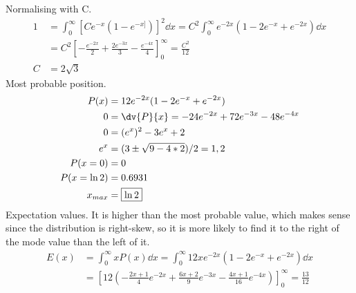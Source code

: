\documentclass[newpage]{homework}
\begin{document}
\question
Normalising with C.
\begin{align*}
    1	&=	\int_0^\infty [Ce^{-x} (1-e^{-x]})]^2 \dd{x}
    = C^2 \int_0^\infty e^{-2x} (1 - 2e^{-x} + e^{-2x}) \dd{x}  \\
    &=  C^2 [-\frac{e^{-2x}}{2} + \frac{2e^{-3x}}{3} - \frac{e^{-4x}}{4}]_0^\infty
    = \frac{C^2}{12}    \\
    C &= \boxed{2\sqrt{3}}
\end{align*}
Most probable position.
\begin{align*}
    P(x)    &=  12 e^{-2x} (1 - 2e^{-x} + e^{-2x})	\\
    0   &=   \dv{P}{x}   = -24e^{-2x} + 72e^{-3x} - 48e^{-4x}   \\
    0   &=  (e^x)^2 - 3e^x + 2  \\
    e^x &=  (3 \pm \sqrt{9 - 4*2})/2 = 1,2  \\
    P(x=0)  &=  0   \\
    P(x=\ln{2}) &= 0.6931   \\
    x_{max} &=  \boxed{\ln{2}}
\end{align*}
Expectation values. It is higher than the most probable value, which makes sense since the distribution is right-skew, so it is more likely to find it to the right of the mode value than the left of it.
\begin{align*}
    E(x)	&=	\int_0^\infty xP(x) \dd{x}
    = \int_0^\infty 12x e^{-2x} (1 - 2e^{-x} + e^{-2x}) \dd{x} \\
    &= \left[ 12 \left( -\frac{2x+1}{4} e^{-2x}   + \frac{6x+2}{9} e^{-3x} - \frac{4x+1}{16} e^{-4x}   \right)  \right]_0^\infty
    = \boxed{\frac{13}{12}}
\end{align*}
\end{document}
